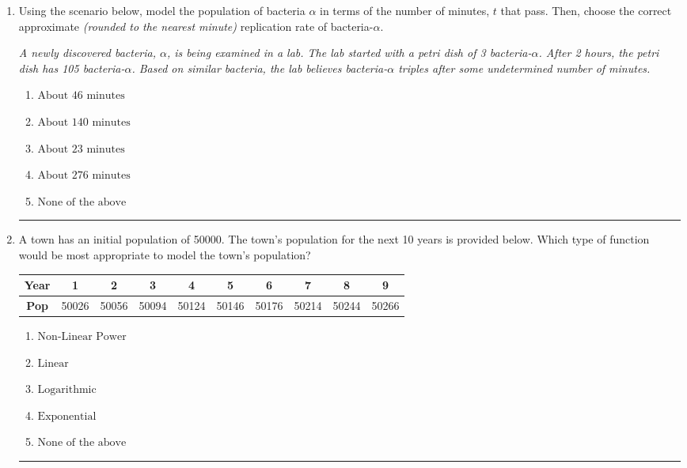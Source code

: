 \documentclass[14pt]{extbook}
\newcommand{\litem}[1]{\item#1\hspace*{-1cm}\rule{\textwidth}{0.4pt}}
\begin{document}
\begin{enumerate}
{\begin{enumerate}[label=\Alph*.]
\end{enumerate} }
\litem{
Using the scenario below, model the population of bacteria $\alpha$ in terms of the number of minutes, $t$ that pass. Then, choose the correct approximate \textit{(rounded to the nearest minute)} replication rate of bacteria-$\alpha$.
\begin{center}
    \textit{ A newly discovered bacteria, $\alpha$, is being examined in a lab. The lab started with a petri dish of 3 bacteria-$\alpha$. After 2 hours, the petri dish has 105 bacteria-$\alpha$. Based on similar bacteria, the lab believes bacteria-$\alpha$ triples after some undetermined number of minutes. }
\end{center}
\begin{enumerate}[label=\Alph*.]
\item \( \text{About } 46 \text{ minutes} \)
\item \( \text{About } 140 \text{ minutes} \)
\item \( \text{About } 23 \text{ minutes} \)
\item \( \text{About } 276 \text{ minutes} \)
\item \( \text{None of the above} \)

\end{enumerate} }
\litem{
A town has an initial population of 50000. The town's population for the next 10 years is provided below. Which type of function would be most appropriate to model the town's population?

\begin{tabular}{c|c|c|c|c|c|c|c|c|c}
\textbf{Year} &1 &2 &3 &4 &5 &6 &7 &8 &9\tabularnewline \hline
\textbf{Pop} &50026 &50056 &50094 &50124 &50146 &50176 &50214 &50244 &50266\end{tabular}\begin{enumerate}[label=\Alph*.]
\item \( \text{Non-Linear Power} \)
\item \( \text{Linear} \)
\item \( \text{Logarithmic} \)
\item \( \text{Exponential} \)
\item \( \text{None of the above} \)


\end{enumerate}}
\end{enumerate}
\end{document}
